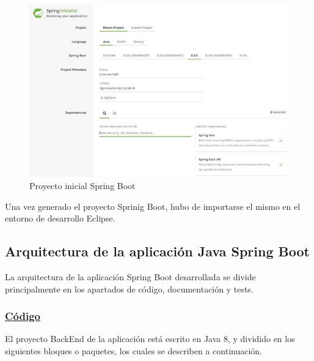    \begin{figure}[h]
    \centering
     \includegraphics[width=1\textwidth]{images/springstarter}
    \caption{Proyecto inicial Spring Boot}
    \end{figure}
    
    Una vez generado el proyecto Sprinig Boot, hubo de importarse el mismo en el entorno de desarrollo Eclipse.
    
    
    \subsection{Arquitectura de la aplicación Java Spring Boot}
    La arquitectura de la aplicación Spring Boot desarrollada se divide principalmente en los apartados de código, documentación y tests.

        \subsubsection{\underline{Código}}
        El proyecto BackEnd de la aplicación está escrito en Java 8, y dividido en los siguientes bloques o paquetes, los cuales se describen a continuación.
        
